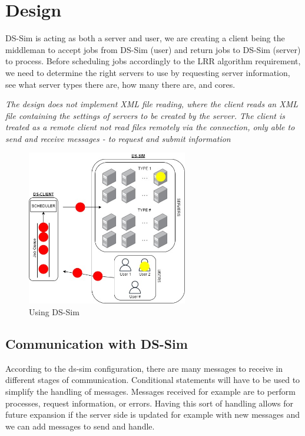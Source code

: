 \documentclass[a4paper]{article} %
\begin{document}
\break
\section{Design}
\label{sec:section3}
DS-Sim is acting as both a server and user, we are creating a client being the middleman to accept jobs from DS-Sim (user) and return jobs to DS-Sim (server) to process. Before scheduling jobs accordingly to the LRR algorithm requirement, we need to determine the right servers to use by requesting server information, see what server types there are, how many there are, and cores.

\medskip
\textit{The design does not implement XML file reading, where the client reads an XML file containing the settings of servers to be created by the server. The client is treated as a remote client not read files remotely via the connection, only able to send and receive messages - to request and submit information}

\begin{figure}[!h]
    \centering
    \includegraphics[width=7cm]{images/ds-serverANDclient diagram.jpg}
    \caption{Using DS-Sim}
    \label{fig:my_label}
\end{figure}

\subsection{Communication with DS-Sim}
According to the ds-sim configuration, there are many messages to receive in different stages of communication. Conditional statements will have to be used to simplify the handling of messages. Messages received for example are to perform processes, request information, or errors. Having this sort of handling allows for future expansion if the server side is updated for example with new messages and we can add messages to send and handle.
\end{document}
